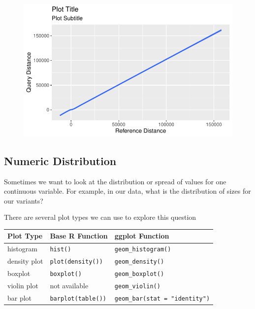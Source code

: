 \documentclass[
  letterpaper,
  DIV=11,
  numbers=noendperiod]{scrreprt}
\begin{document}
\begin{figure}[H]

{\centering \includegraphics{scripts/02_dataViz/class3_files/figure-pdf/unnamed-chunk-12-2.pdf}

}

\end{figure}

\hypertarget{numeric-distribution}{%
\subsection{Numeric Distribution}\label{numeric-distribution}}

Sometimes we want to look at the distribution or spread of values for
one continuous variable. For example, in our data, what is the
distribution of sizes for our variants?

There are several plot types we can use to explore this question

\begin{longtable}[]{@{}lll@{}}
\toprule()
Plot Type & Base R Function & ggplot Function \\
\midrule()
\endhead
histogram & \texttt{hist()} & \texttt{geom\_histogram()} \\
density plot & \texttt{plot(density())} & \texttt{geom\_density()} \\
boxplot & \texttt{boxplot()} & \texttt{geom\_boxplot()} \\
violin plot & not available & \texttt{geom\_violin()} \\
bar plot & \texttt{barplot(table())} &
\texttt{geom\_bar(stat\ =\ "identity")} \\
\bottomrule()
\end{longtable}
\end{document}
